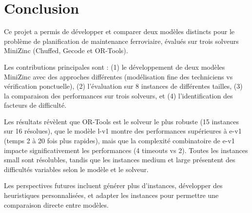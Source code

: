 \section{Conclusion}
\label{sec:conclusion}

Ce projet a permis de développer et comparer deux modèles distincts pour le problème de planification de maintenance ferroviaire, évalués sur trois solveurs MiniZinc (Chuffed, Gecode et OR-Tools).

Les contributions principales sont : (1) le développement de deux modèles MiniZinc avec des approches différentes (modélisation fine des techniciens vs vérification ponctuelle), (2) l'évaluation sur 8 instances de différentes tailles, (3) la comparaison des performances sur trois solveurs, et (4) l'identification des facteurs de difficulté.

Les résultats révèlent que OR-Tools est le solveur le plus robuste (15 instances sur 16 résolues), que le modèle l-v1 montre des performances supérieures à e-v1 (temps 2 à 20 fois plus rapides), mais que la complexité combinatoire de e-v1 impacte significativement les performances (4 timeouts vs 2). Toutes les instances small sont résolubles, tandis que les instances medium et large présentent des difficultés variables selon le modèle et le solveur.

Les perspectives futures incluent générer plus d'instances, développer des heuristiques personnalisées, et adapter les instances pour permettre une comparaison directe entre modèles.
